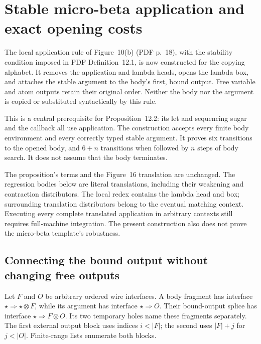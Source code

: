 \clearpage
\section{Stable micro-beta application and exact opening costs}
\label{sec:copying-application}
The local application rule of Figure~10(b) (PDF p.~18), with the stability
condition imposed in PDF Definition~12.1, is now constructed for the copying
alphabet. It removes the application and lambda heads, opens the lambda box,
and attaches the stable argument to the body's first, bound output. Free
variable and atom outputs retain their original order. Neither the body nor
the argument is copied or substituted syntactically by this rule.

This is a central prerequisite for Proposition~12.2: its let and sequencing
sugar and the callback all use application. The construction accepts every
finite body environment and every correctly typed stable argument. It proves
six transitions to the opened body, and $6+n$ transitions when followed by
$n$ steps of body search. It does not assume that the body terminates.

The proposition's terms and the Figure~16 translation are unchanged.
The regression bodies below are literal translations, including their
weakening and contraction distributors. The local redex contains the lambda
head and box; surrounding translation distributors belong to the eventual
matching context. Executing every complete translated application in arbitrary
contexts still requires full-machine integration. The present construction
also does not prove the micro-beta template's robustness.

\subsection{Connecting the bound output without changing free outputs}

Let $F$ and $O$ be arbitrary ordered wire interfaces. A body fragment has
interface $\star\Rightarrow\star\otimes F$, while its argument has interface
$\star\Rightarrow O$. Their bound-output splice has interface
$\star\Rightarrow F\otimes O$. Its two temporary holes name these fragments
separately. The first external output block uses indices $i<|F|$; the second
uses $|F|+j$ for $j<|O|$. Finite-range lists enumerate both blocks.


